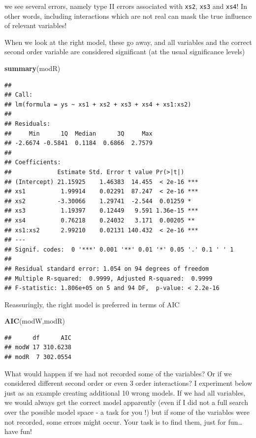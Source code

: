 \documentclass[
]{book}
\newenvironment{Shaded}{\begin{snugshade}}{\end{snugshade}}
\newcommand{\KeywordTok}[1]{\textcolor[rgb]{0.13,0.29,0.53}{\textbf{#1}}}
\newcommand{\NormalTok}[1]{#1}
\begin{document}
we see several errors, namely type II errors associated with \texttt{xs2}, \texttt{xs3} and \texttt{xs4}! In other words, including interactions which are not real can mask the true influence of relevant variables!

When we look at the right model, these go away, and all variables and the correct second order variable are considered significant (at the usual significance levels)

\begin{Shaded}
\begin{Highlighting}[]
\KeywordTok{summary}\NormalTok{(modR)}
\end{Highlighting}
\end{Shaded}

\begin{verbatim}
## 
## Call:
## lm(formula = ys ~ xs1 + xs2 + xs3 + xs4 + xs1:xs2)
## 
## Residuals:
##     Min      1Q  Median      3Q     Max 
## -2.6674 -0.5841  0.1184  0.6866  2.7579 
## 
## Coefficients:
##             Estimate Std. Error t value Pr(>|t|)    
## (Intercept) 21.15925    1.46383  14.455  < 2e-16 ***
## xs1          1.99914    0.02291  87.247  < 2e-16 ***
## xs2         -3.30066    1.29741  -2.544  0.01259 *  
## xs3          1.19397    0.12449   9.591 1.36e-15 ***
## xs4          0.76218    0.24032   3.171  0.00205 ** 
## xs1:xs2      2.99210    0.02131 140.432  < 2e-16 ***
## ---
## Signif. codes:  0 '***' 0.001 '**' 0.01 '*' 0.05 '.' 0.1 ' ' 1
## 
## Residual standard error: 1.054 on 94 degrees of freedom
## Multiple R-squared:  0.9999,	Adjusted R-squared:  0.9999 
## F-statistic: 1.806e+05 on 5 and 94 DF,  p-value: < 2.2e-16
\end{verbatim}

Reassuringly, the right model is preferred in terms of AIC

\begin{Shaded}
\begin{Highlighting}[]
\KeywordTok{AIC}\NormalTok{(modW,modR)}
\end{Highlighting}
\end{Shaded}

\begin{verbatim}
##      df      AIC
## modW 17 310.6238
## modR  7 302.0554
\end{verbatim}

What would happen if we had not recorded some of the variables? Or if we considered different second order or even 3 order interactions? I experiment below just as an example creating additional 10 wrong models. If we had all variables, we would always get the correct model apparently (even if I did not a full search over the possible model space - a task for you !) but if some of the variables were not recorded, some errors might occur. Your task is to find them, just for fun\ldots{} have fun!
\end{document}
